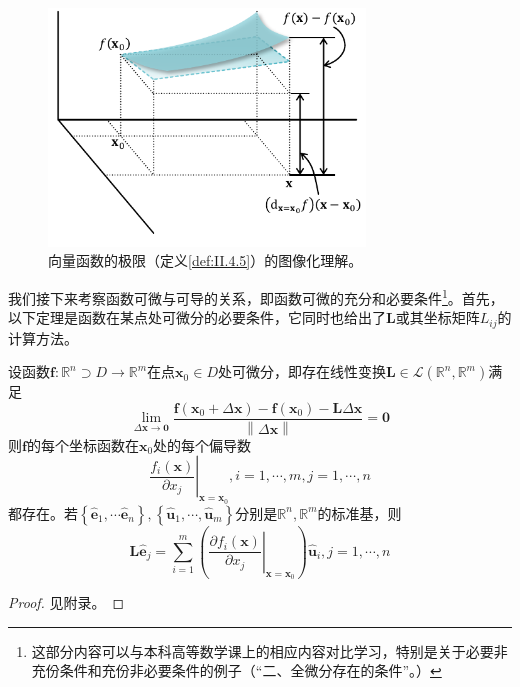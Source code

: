 \documentclass[main.tex]{subfiles}
\begin{document}
\begin{figure}[h]
    \centering
    \includegraphics[width=0.75\textwidth]{images/II.4.7.pdf}
    \caption{向量函数的极限（定义\ref{def:II.4.5}）的图像化理解。}
    \label{fig:II.4.7}
\end{figure}

我们接下来考察函数可微与可导的关系，即函数可微的充分和必要条件\footnote{这部分内容可以与本科高等数学课上的相应内容对比学习，特别是关于必要非充份条件和充份非必要条件的例子（“二、全微分存在的条件”\cite[p.~20]{华工高数2009下}。）}。首先，以下定理是函数在某点处可微分的必要条件，它同时也给出了$\mathbf{L}$或其坐标矩阵$L_{ij}$的计算方法。

\begin{theorem}\label{thm:II.4.7}
    设函数$\mathbf{f}:\mathbb{R}^n\supset D\rightarrow\mathbb{R}^m$在点$\mathbf{x}_0\in D$处可微分，即存在线性变换$\mathbf{L}\in\mathcal{L}\left(\mathbb{R}^n,\mathbb{R}^m\right)$满足
    \[
        \lim_{\Delta\mathbf{x}\to\mathbf{0}}\frac{\mathbf{f}\left(\mathbf{x}_0+\Delta \mathbf{x}\right)-\mathbf{f}\left(\mathbf{x}_0\right)-\mathbf{L}\Delta\mathbf{x}}{\left\|\Delta\mathbf{x}\right\|}=\mathbf{0}
    \]
    则$\mathbf{f}$的每个坐标函数在$\mathbf{x}_0$处的每个偏导数
    \[
        \left.\frac{f_i\left(\mathbf{x}\right)}{\partial x_j}\right|_{\mathbf{x}=\mathbf{x}_0},i=1,\cdots,m,j=1,\cdots,n
    \]
    都存在。若$\left\{\mathbf{\hat{e}}_1,\cdots\mathbf{\hat{e}}_n\right\},\left\{\mathbf{\hat{u}}_1,\cdots,\mathbf{\hat{u}}_m\right\}$分别是$\mathbb{R}^n,\mathbb{R}^m$的标准基，则
    \[
        \mathbf{L\hat{e}}_j=\sum_{i=1}^m\left(\left.\frac{\partial f_i\left(\mathbf{x}\right)}{\partial x_j}\right|_{\mathbf{x}=\mathbf{x}_0}\right)\mathbf{\hat{u}}_i,j=1,\cdots,n
    \]
\end{theorem}
\begin{proof}
    见附录。
\end{proof}
\end{document}
